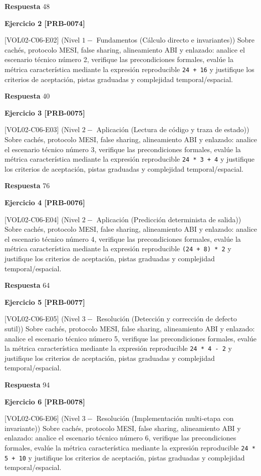 \documentclass{book}
\begin{document}
\noindent\textbf{Respuesta} 48

\noindent\textbf{Ejercicio 2 [PRB-0074]}

[VOL02-C06-E02] (Nivel \(1 -\) Fundamentos (Cálculo directo e invariantes)) Sobre cachés, protocolo MESI, false sharing, alineamiento ABI y enlazado: analice el escenario técnico número 2, verifique las precondiciones formales, evalúe la métrica característica mediante la expresión reproducible \texttt{24 + 16} y justifique los criterios de aceptación, pistas graduadas y complejidad temporal/espacial.

\noindent\textbf{Respuesta} 40

\noindent\textbf{Ejercicio 3 [PRB-0075]}

[VOL02-C06-E03] (Nivel \(2 -\) Aplicación (Lectura de código y traza de estado)) Sobre cachés, protocolo MESI, false sharing, alineamiento ABI y enlazado: analice el escenario técnico número 3, verifique las precondiciones formales, evalúe la métrica característica mediante la expresión reproducible \texttt{24 * 3 + 4} y justifique los criterios de aceptación, pistas graduadas y complejidad temporal/espacial.

\noindent\textbf{Respuesta} 76

\noindent\textbf{Ejercicio 4 [PRB-0076]}

[VOL02-C06-E04] (Nivel \(2 -\) Aplicación (Predicción determinista de salida)) Sobre cachés, protocolo MESI, false sharing, alineamiento ABI y enlazado: analice el escenario técnico número 4, verifique las precondiciones formales, evalúe la métrica característica mediante la expresión reproducible \texttt{(24 + 8) * 2} y justifique los criterios de aceptación, pistas graduadas y complejidad temporal/espacial.

\noindent\textbf{Respuesta} 64

\noindent\textbf{Ejercicio 5 [PRB-0077]}

[VOL02-C06-E05] (Nivel \(3 -\) Resolución (Detección y corrección de defecto sutil)) Sobre cachés, protocolo MESI, false sharing, alineamiento ABI y enlazado: analice el escenario técnico número 5, verifique las precondiciones formales, evalúe la métrica característica mediante la expresión reproducible \texttt{24 * 4 - 2} y justifique los criterios de aceptación, pistas graduadas y complejidad temporal/espacial.

\noindent\textbf{Respuesta} 94

\noindent\textbf{Ejercicio 6 [PRB-0078]}

[VOL02-C06-E06] (Nivel \(3 -\) Resolución (Implementación multi-etapa con invariante)) Sobre cachés, protocolo MESI, false sharing, alineamiento ABI y enlazado: analice el escenario técnico número 6, verifique las precondiciones formales, evalúe la métrica característica mediante la expresión reproducible \texttt{24 * 5 + 10} y justifique los criterios de aceptación, pistas graduadas y complejidad temporal/espacial.
\end{document}
